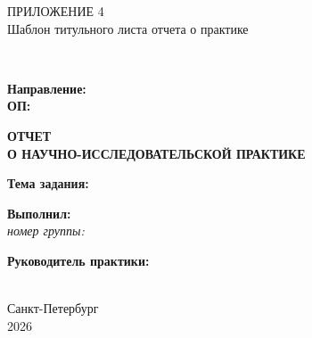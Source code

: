 \begin{flushright}
{\large ПРИЛОЖЕНИЕ 4}\\[0.5em]
Шаблон титульного листа отчета о практике
\end{flushright}

\vspace{1.5em}

\begin{center}
\textbf{\MakeUppercase{\UniversityName}}\\[1.5em]
\begin{flushleft}
\textbf{Направление:} \DirectionName\\
\textbf{ОП:} \ProgramName
\end{flushleft}

\vspace{3.5cm}

{\Large\bfseries ОТЧЕТ\\[0.4em]О НАУЧНО-ИССЛЕДОВАТЕЛЬСКОЙ ПРАКТИКЕ}
\end{center}

\vspace{2.5cm}

\noindent\textbf{Тема задания:} \PracticeTheme

\vspace{3cm}

\begin{flushright}
\begin{minipage}{0.58\textwidth}
\textbf{Выполнил:} \StudentName\\
\textit{номер группы:} \StudentGroup

\vspace{1.5em}

\textbf{Руководитель практики:}\\
\SupervisorName\\
\SupervisorRole
\end{minipage}
\end{flushright}

\vfill

\begin{center}
Санкт-Петербург\\
2026
\end{center}
